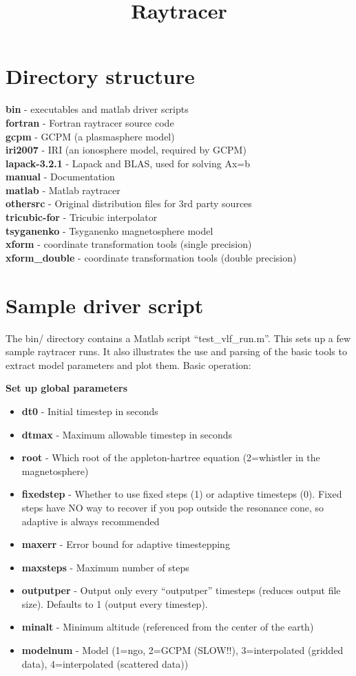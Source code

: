 \documentclass[10pt]{article}
\begin{document}
\title{Raytracer}
\section{Directory structure}
{\bf bin} - executables and matlab driver scripts \\
{\bf fortran} - Fortran raytracer source code \\
{\bf gcpm} - GCPM (a plasmasphere model) \\
{\bf iri2007} - IRI (an ionosphere model, required by GCPM) \\
{\bf lapack-3.2.1} - Lapack and BLAS, used for solving Ax=b \\
{\bf manual} - Documentation \\
{\bf matlab} - Matlab raytracer \\
{\bf othersrc} - Original distribution files for 3rd party sources \\
{\bf tricubic-for} - Tricubic interpolator \\
{\bf tsyganenko} - Tsyganenko magnetosphere model \\
{\bf xform} - coordinate transformation tools (single precision) \\
{\bf xform\_double} - coordinate transformation tools (double
precision) \\

\section{Sample driver script}
The bin/ directory contains a Matlab script ``test\_vlf\_run.m''.  This
sets up a few sample raytracer runs.  It also illustrates the use and
parsing of the basic tools to extract model parameters and plot them.
Basic operation:

{\bf Set up global parameters}
\begin{itemize}
\item {\bf dt0} - Initial timestep in seconds
\item {\bf dtmax} - Maximum allowable timestep in seconds
\item {\bf root} - Which root of the appleton-hartree equation
  (2=whistler in the magnetosphere)
\item {\bf fixedstep} - 
  Whether to use fixed steps (1) or adaptive timesteps (0).
  Fixed steps have NO way to recover if you pop outside the resonance
  cone, so adaptive is always recommended
\item {\bf maxerr} - Error bound for adaptive timestepping
\item {\bf maxsteps} - Maximum number of steps
\item {\bf outputper} - Output only every ``outputper'' timesteps
  (reduces output file size).  Defaults to 1 (output every timestep).
\item {\bf minalt} - Minimum altitude (referenced from the center of
  the earth)
\item {\bf modelnum} - Model (1=ngo, 2=GCPM (SLOW!!), 3=interpolated
  (gridded data),
  4=interpolated (scattered data))
\end{itemize}
\end{document}

